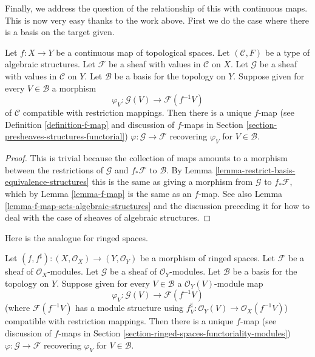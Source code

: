 \noindent
Finally, we address the question of the relationship of this with
continuous maps. This is now very easy thanks to the work
above. First we do the case where there is a basis on the
target given.

\begin{lemma}
\label{lemma-f-map-basis-below-structures}
Let $f : X \to Y$ be a continuous map of topological spaces.
Let $(\mathcal{C}, F)$ be a type of algebraic structures.
Let $\mathcal{F}$ be a sheaf with values in $\mathcal{C}$ on $X$.
Let $\mathcal{G}$ be a sheaf with values in $\mathcal{C}$ on $Y$.
Let $\mathcal{B}$ be a basis for the topology on $Y$.
Suppose given for every $V \in \mathcal{B}$ a morphism
$$
\varphi_V :
\mathcal{G}(V)
\longrightarrow
\mathcal{F}(f^{-1}V)
$$
of $\mathcal{C}$ compatible with restriction mappings.
Then there is a unique $f$-map (see Definition \ref{definition-f-map}
and discussion of $f$-maps in
Section \ref{section-presheaves-structures-functorial})
$\varphi : \mathcal{G} \to \mathcal{F}$
recovering $\varphi_V$ for $V \in \mathcal{B}$.
\end{lemma}

\begin{proof}
This is trivial because the collection of maps
amounts to a morphism between the restrictions
of $\mathcal{G}$ and $f_*\mathcal{F}$ to $\mathcal{B}$.
By Lemma \ref{lemma-restrict-basis-equivalence-structures}
this is the same as giving a morphism from $\mathcal{G}$
to $f_*\mathcal{F}$, which by Lemma \ref{lemma-f-map}
is the same as an $f$-map. See also
Lemma \ref{lemma-f-map-sets-algebraic-structures}
and the discussion preceding it
for how to deal with the case of sheaves of algebraic structures.
\end{proof}

\noindent
Here is the analogue for ringed spaces.

\begin{lemma}
\label{lemma-f-map-basis-below-modules}
Let $(f, f^\sharp) : (X, \mathcal{O}_X) \to (Y, \mathcal{O}_Y)$
be a morphism of ringed spaces.
Let $\mathcal{F}$ be a sheaf of $\mathcal{O}_X$-modules.
Let $\mathcal{G}$ be a sheaf of $\mathcal{O}_Y$-modules.
Let $\mathcal{B}$ be a basis for the topology on $Y$.
Suppose given for every $V \in \mathcal{B}$ a
$\mathcal{O}_Y(V)$-module map
$$
\varphi_V :
\mathcal{G}(V)
\longrightarrow
\mathcal{F}(f^{-1}V)
$$
(where $\mathcal{F}(f^{-1}V)$ has a module structure using
$f^\sharp_V : \mathcal{O}_Y(V) \to \mathcal{O}_X(f^{-1}V)$)
compatible with restriction mappings.
Then there is a unique $f$-map (see discussion of $f$-maps in
Section \ref{section-ringed-spaces-functoriality-modules})
$\varphi : \mathcal{G} \to \mathcal{F}$
recovering $\varphi_V$ for $V \in \mathcal{B}$.
\end{lemma}

